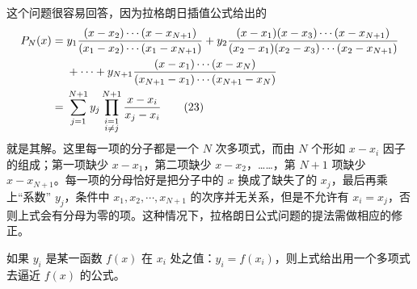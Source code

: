 这个问题很容易回答，因为拉格朗日插值公式给出的
\begin{align}
 P_N(x)={}&y_1\frac{(x-x_2)\cdots(x-x_{N+1})}{(x_1-x_2)\cdots(x_1-x_{N+1})}
 +y_2\frac{(x-x_1)(x-x_3)\cdots(x-x_{N+1})}{(x_2-x_1)(x_2-x_3)\cdots(x_2-x_{N+1})}\notag\\
 &+\cdots+y_{N+1}\frac{(x-x_1)\cdots(x-x_N)}{(x_{N+1}-x_1)\cdots(x_{N+1}-x_N)}\notag\\
 ={}&\sum_{j=1}^{N+1}y_j\prod_{\substack{i=1\\i\ne j}}^{N+1}\frac{x-x_i}{x_j-x_i}
 \tag{23}
\end{align}
就是其解。这里每一项的分子都是一个 $N$ 次多项式，而由 $N$ 个形如 $x-x_i$ 因子的组成；第一项缺少 $x-x_1$，第二项缺少 $x-x_2$，……，第 $N+1$ 项缺少 $x-x_{N+1}$。每一项的分母恰好是把分子中的 $x$ 换成了缺失了的 $x_j$，最后再乘上“系数” $y_j$，条件中 $x_1,x_2,\cdots,x_{N+1}$ 的次序并无关系，但是不允许有 $x_i=x_j$，否则上式会有分母为零的项。这种情况下，拉格朗日公式问题的提法需做相应的修正。

如果 $y_i$ 是某一函数 $f(x)$ 在 $x_i$ 处之值：$y_i=f(x_i)$，则上式给出用一个多项式去逼近 $f(x)$ 的公式。

